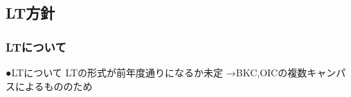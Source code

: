 \subsection*{LT方針}


\subsubsection*{LTについて}
●LTについて
 LTの形式が前年度通りになるか未定
  →BKC,OICの複数キャンパスによるもののため

